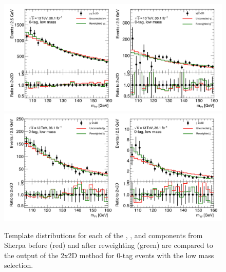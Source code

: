 \begin{figure}[!htbp]
  \centering
  \includegraphics[width=\textwidth]{chapters/chapter5_yybb/images/2x2d/low_mass_1_clean.pdf}\\
  \includegraphics[width=\textwidth]{chapters/chapter5_yybb/images/2x2d/low_mass_2_clean.pdf}
  \caption[Template distributions for each of the \yy, \yj, \jy and \jj components before and after reweighting compared to the output of the 2x2D method for 0-tag events with the low mass selection]{Template distributions for each of the \yy, \yj, \jy and \jj components from Sherpa before (red) and after reweighting (green) are compared to the output of the 2x2D method for 0-tag events with the low mass selection.
    \label{fig:2x2D_templates_lowMass}}
\end{figure}


